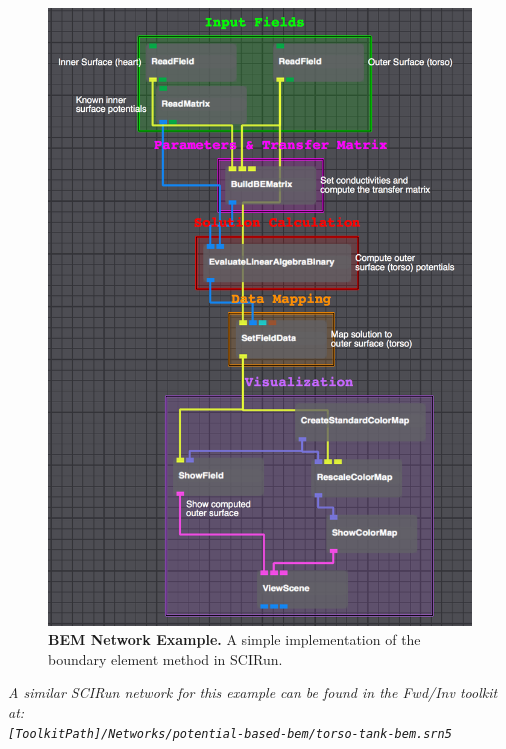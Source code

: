 \begin{figure}[H]
\begin{center}
\includegraphics[width=.9\textwidth]{ECGToolkitGuide_figures/BEMnetwork.png}
\caption{{\bf BEM Network Example.} A simple implementation of the boundary element method in SCIRun.}
\label{fig:BEMnet}
\end{center}
\vspace{-.25in}
\end{figure}

\textit{A similar SCIRun network for this example can be found in the Fwd/Inv toolkit at:\\{\tt [ToolkitPath]/Networks/potential-based-bem/torso-tank-bem.srn5}}

